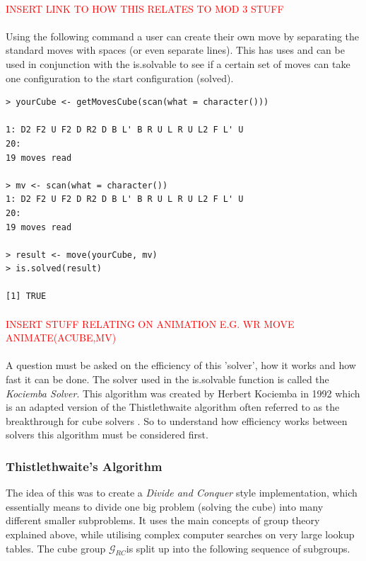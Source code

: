 \documentclass{article}
\begin{document}
\paragraph*{}
\textcolor{red}{INSERT LINK TO HOW THIS RELATES TO MOD 3 STUFF}
\paragraph*{}
Using the following command a user can create their own move by separating the standard moves with spaces (or even separate lines). This has uses and can be used in conjunction with the is.solvable to see if a certain set of moves can take one configuration to the start configuration (solved).
\begin{lstlisting}
> yourCube <- getMovesCube(scan(what = character()))

1: D2 F2 U F2 D R2 D B L' B R U L R U L2 F L' U
20:
19 moves read

> mv <- scan(what = character())
1: D2 F2 U F2 D R2 D B L' B R U L R U L2 F L' U
20:
19 moves read

> result <- move(yourCube, mv)
> is.solved(result)

[1] TRUE
\end{lstlisting}
\paragraph*{}
\textcolor{red}{INSERT STUFF RELATING ON ANIMATION E.G. WR MOVE ANIMATE(ACUBE,MV)}
\paragraph*{}

A question must be asked on the efficiency of this 'solver', how it works and how fast it can be done. 
The solver used in the is.solvable function is called the \textit{Kociemba Solver}. This algorithm was created by Herbert Kociemba in 1992 which is an adapted version of the Thistlethwaite algorithm often referred to as the breakthrough for cube solvers\cite{Thistlethwaite}
. So to understand how efficiency works between solvers this algorithm must be considered first.

\subsubsection*{Thistlethwaite's Algorithm}

The idea of this was to create a \textit{Divide and Conquer} style implementation, which essentially means to divide one big problem (solving the cube) into many different smaller subproblems. It uses the main concepts of group theory explained above, while utilising complex computer searches on very large lookup tables. 
The cube group $\mathcal{G}_{RC}$is split up into the following sequence of subgroups.  
\end{document}
